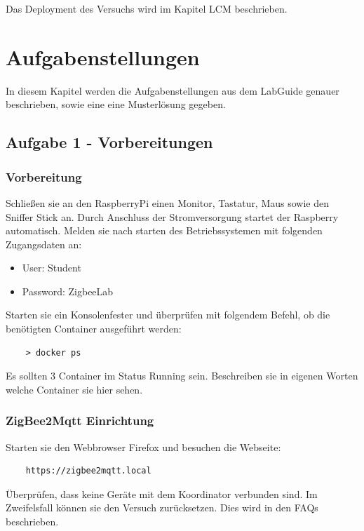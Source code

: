 Das Deployment des
Versuchs wird im Kapitel LCM beschrieben.

\section{Aufgabenstellungen}

In diesem Kapitel werden die Aufgabenstellungen aus dem LabGuide genauer beschrieben, sowie eine eine Musterlösung gegeben.



\subsection{Aufgabe 1 - Vorbereitungen}

\subsubsection{Vorbereitung}
Schließen sie an den RaspberryPi einen Monitor, Tastatur, Maus sowie den Sniffer Stick an. Durch Anschluss der
Stromversorgung startet der Raspberry automatisch. Melden sie nach starten des Betriebssystemen mit folgenden Zugangsdaten an:

\begin{itemize}
    \item User: Student 
    \item Password: ZigbeeLab
\end{itemize}

Starten sie ein Konsolenfester und überprüfen mit folgendem Befehl, ob die benötigten Container ausgeführt werden:
\begin{lstlisting}
    > docker ps
\end{lstlisting}

Es sollten 3 Container im Status \grqq Running\grqq{} sein. Beschreiben sie in eigenen Worten welche Container sie hier sehen.

\subsubsection{ZigBee2Mqtt Einrichtung}
Starten sie den Webbrowser Firefox und besuchen die Webseite:
\begin{lstlisting}
    https://zigbee2mqtt.local
\end{lstlisting}

Überprüfen, dass keine Geräte mit dem Koordinator verbunden sind. Im Zweifelsfall können sie den Versuch zurücksetzen.
Dies wird in den FAQs beschrieben.

